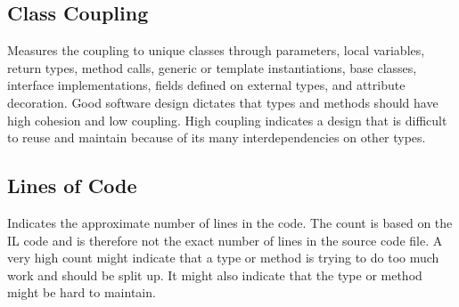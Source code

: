 \documentclass{article}
\begin{document}
\subsection{Class Coupling}
Measures the coupling to unique classes through parameters, local variables, return types, method calls, generic or template instantiations, base classes, interface implementations, fields defined on external types, and attribute decoration. Good software design dictates that types and methods should have high cohesion and low coupling. High coupling indicates a design that is difficult to reuse and maintain because of its many interdependencies on other types.
\subsection{Lines of Code}
Indicates the approximate number of lines in the code. The count is based on the IL code and is therefore not the exact number of lines in the source code file. A very high count might indicate that a type or method is trying to do too much work and should be split up. It might also indicate that the type or method might be hard to maintain.
\end{document}
